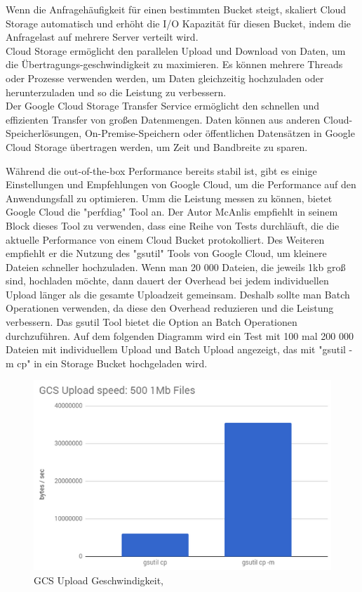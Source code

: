  Wenn die Anfragehäufigkeit für einen bestimmten Bucket steigt, skaliert Cloud Storage automatisch und erhöht die I/O Kapazität für diesen Bucket, indem die Anfragelast auf mehrere Server verteilt wird.\\
 
Cloud Storage ermöglicht den parallelen Upload und Download von Daten, um die Übertragungs-geschwindigkeit zu maximieren. Es können mehrere Threads oder Prozesse verwenden werden, um Daten gleichzeitig hochzuladen oder herunterzuladen und so die Leistung zu verbessern.\\

Der Google Cloud Storage Transfer Service ermöglicht den schnellen und effizienten Transfer von großen Datenmengen. Daten können aus anderen Cloud-Speicherlösungen, On-Premise-Speichern oder öffentlichen Datensätzen in Google Cloud Storage übertragen werden, um Zeit und Bandbreite zu sparen.

\newpage

Während die out-of-the-box Performance bereits stabil ist, gibt es einige Einstellungen und Empfehlungen von Google Cloud, um die Performance auf den Anwendungsfall zu optimieren. Umm die Leistung messen zu können, bietet Google Cloud die "perfdiag" Tool an. Der Autor McAnlis empfiehlt in seinem Block  dieses Tool zu verwenden, dass eine Reihe von Tests durchläuft, die die aktuelle Performance von einem Cloud Bucket protokolliert. Des Weiteren empfiehlt er die Nutzung des "gsutil" Tools von Google Cloud, um kleinere Dateien schneller hochzuladen. Wenn man 20 000 Dateien, die jeweils 1kb groß sind, hochladen möchte, dann dauert der Overhead bei jedem individuellen Upload länger als die gesamte Uploadzeit gemeinsam. Deshalb sollte man Batch Operationen verwenden, da diese den Overhead reduzieren und die Leistung verbessern. Das gsutil Tool bietet die Option an Batch Operationen durchzuführen. Auf dem folgenden Diagramm wird ein Test mit 100 mal 200 000 Dateien mit individuellem Upload und Batch Upload angezeigt, das mit "gsutil -m cp" in ein Storage Bucket hochgeladen wird.

\begin{figure}[h]
	\centering
	\includegraphics[width=12cm,keepaspectratio]{Pictures/cloud-storage-performance.png}
	\caption{GCS Upload Geschwindigkeit, }
\end{figure}

